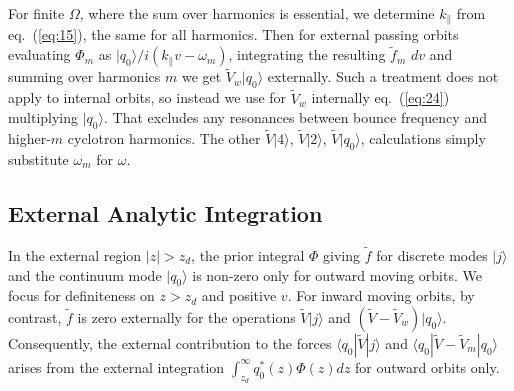 \documentclass[12pt]{article}
\def\ket#1{|#1\rangle}
\def\bra#1{\langle#1}
\begin{document}
For finite $\Omega$, where the sum over harmonics is essential, we
determine $k_\parallel$ from eq.\ (\ref{eq:15}), the same for all
harmonics. Then for external passing orbits evaluating $\Phi_m$ as
$\ket{q_0}/i(k_\parallel v -\omega_m)$, integrating the resulting
$\tilde f_m$ $dv$ and summing over harmonics $m$ we get
$\tilde V_w\ket{q_0}$ externally. Such a treatment does not
apply to internal orbits, so instead we use for $\tilde V_w$ internally
eq.\ (\ref{eq:24}) multiplying $\ket{q_0}$. That excludes any resonances
between bounce frequency and higher-$m$ cyclotron harmonics. The other
$\tilde V\ket{4}$, $\tilde V\ket{2}$, $\tilde V\ket{q_0}$, calculations
simply substitute $\omega_m$ for $\omega$.

\subsection{External Analytic Integration}

In the external region $|z|>z_d$, the prior integral $\Phi$ giving
$\tilde f$ for discrete modes $\ket{j}$ and the continuum mode
$\ket{q_0}$ is non-zero only for outward moving orbits. We focus for
definiteness on $z>z_d$ and positive $v$.  For inward moving orbits,
by contrast, $\tilde f$ is zero externally for the operations
$\tilde V\ket{j}$ and $(\tilde V -\tilde V_w)\ket{q_0}$. Consequently,
the external contribution to the forces $\bra{q_0}|\tilde V \ket{j}$
and $\bra{q_0}|\tilde V -\tilde V_m\ket{q_0}$ arises from the external
integration $\int_{z_d}^\infty q_0^*(z) \Phi(z) dz$ for outward orbits
only.
\end{document}
